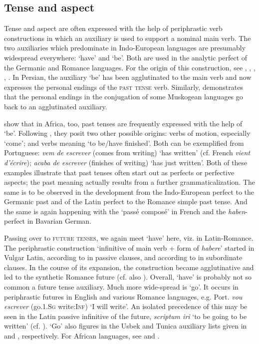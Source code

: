\subsection{Tense and aspect} \label{sec:3.1.4}

Tense and aspect are often expressed with the help of periphrastic verb constructions in which an auxiliary is used to support a nominal main verb. The two auxiliaries which predominate in Indo-European languages are presumably widespread everywhere: ‘have’ and ‘be’. Both are used in the analytic perfect of the Germanic and Romance languages. For the origin of this construction, see \citet[141-143]{Meillet1912}, \citet[§~\textsc{i}]{Benveniste1968}, \citet{Seiler1973}, \citet{Rosén1980}, \citet{Ramat1983}.\label{page31} In Persian, the auxiliary ‘be’ has been agglutinated to the main verb and now expresses the personal endings of the \textsc{past tense} verb. Similarly, \citet{Haas1977} demonstrates that the personal endings in the conjugation of some Muskogean languages go back to an agglutinated auxiliary.

\citet[130]{HeineEtAl1984} show that in Africa, too, past tenses are frequently expressed with the help of ‘be’. Following \citet[§~5]{Givón1973}, they posit two other possible origins: verbs of motion, especially ‘come’; and verbs meaning ‘to be/have finished’. Both can be exemplified from Portuguese: \textit{vem de escrever} (comes from writing) ‘has written’ (cf. French \textit{vient d'écrire}); \textit{acaba de escrever} (finishes of writing) ‘has just written’. Both of these examples illustrate that past tenses often start out as perfects or perfective aspects; the past meaning actually results from a further grammaticalization. The same is to be observed in the development from the Indo-European perfect to the Germanic past and of the Latin perfect to the Romance simple past tense. And the same is again happening with the ‘passé composé’ in French and the \textit{haben}-perfect in Bavarian German.

Passing over to \textsc{future tenses}, we again meet ‘have’ here, viz. in Latin-Romance. The periphrastic construction ‘infinitive of main verb + form of \textit{habere}’ started in Vulgar Latin, according to \citet[§~\textsc{ii}]{Benveniste1968} in passive clauses, and according to \citet{Ineichen1980} in subordinate clauses. In the course of its expansion, the construction became agglutinative and led to the synthetic Romance future (cf. also \citealt[132--151]{Coseriu1974}). Overall, ‘have’ is probably not so common a future tense auxiliary. Much more wide-spread is ‘go’. It occurs in periphrastic futures in English and various Romance languages, e.g. Port. \textit{vou escrever} (go.1.\textsc{Sg} write:\textsc{Inf}) ‘I will write’. An isolated precedence of this may be seen in the Latin passive infinitive of the future, \textit{scriptum iri} ‘to be going to be written’ (cf. \citealt[109--114]{Ultan1978b}). ‘Go’ also figures in the Usbek and Tunica auxiliary lists given in \citet[85f]{Žirmunskij1966} and \citet[41--51]{Haas1941}, respectively. For African languages, see \citet[§~5]{Givón1973} and \citet[131f]{HeineEtAl1984}.


